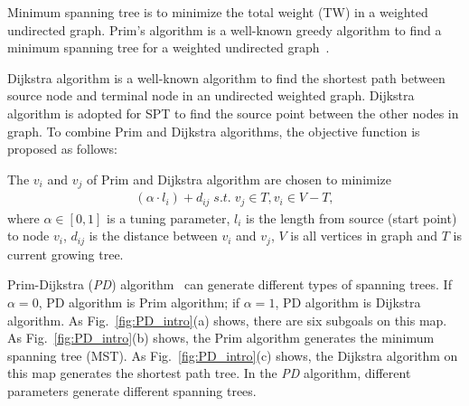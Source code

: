 Minimum spanning tree is to minimize the total weight (TW) in a weighted undirected graph.
Prim's algorithm is a well-known greedy algorithm to find a minimum spanning tree for a weighted undirected graph~\cite{prim1957shortest}.

Dijkstra algorithm is a well-known algorithm to find the shortest path between source node and terminal node in an undirected weighted graph.
Dijkstra algorithm is adopted for SPT to find the source point between the other nodes in graph.
To combine Prim and Dijkstra algorithms, the objective function is proposed as follows:

\begin{definition}
The $v_i$ and $v_j$ of Prim and Dijkstra algorithm are chosen to minimize
\begin{equation}
  \begin{aligned}
    (\alpha\cdot l_i)+d_{ij} \; s.t. \; v_j\in T, v_i \in V - T,
  \end{aligned}
  \label{eq:PD_obj}
\end{equation}
where $\alpha\in[0, 1]$ is a tuning parameter, $l_i$ is the length from source (start point) to node $v_i$, $d_{ij}$ is the distance between $v_i$ and $v_j$, $V$ is all vertices in graph and $T$ is current growing tree.
\end{definition}

Prim-Dijkstra (\emph{PD}) algorithm~\cite{alpert1993direct} can generate different types of spanning trees.
If $\alpha = 0$, PD algorithm is Prim algorithm; if $\alpha = 1$, PD algorithm is Dijkstra algorithm.
As Fig.~\ref{fig:PD_intro}(a) shows, there are six subgoals on this map.
As Fig.~\ref{fig:PD_intro}(b) shows, the Prim algorithm generates the minimum spanning tree (MST).
As Fig.~\ref{fig:PD_intro}(c) shows, the Dijkstra algorithm on this map generates the shortest path tree.
In the \emph{PD} algorithm, different parameters generate different spanning trees.

